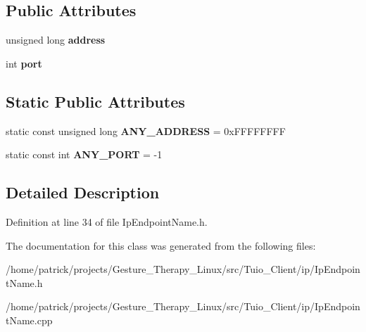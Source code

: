 \subsection*{Public Attributes}
\begin{DoxyCompactItemize}
\item 
\mbox{\label{class_ip_endpoint_name_abd6381f8195c48a266928a5a94f0017b}} 
unsigned long {\bfseries address}
\item 
\mbox{\label{class_ip_endpoint_name_a1fb3434efd055e652f9b4b43ef5ae41b}} 
int {\bfseries port}
\end{DoxyCompactItemize}
\subsection*{Static Public Attributes}
\begin{DoxyCompactItemize}
\item 
\mbox{\label{class_ip_endpoint_name_afea73a019c63cf3aa2bae83b0e1499ab}} 
static const unsigned long {\bfseries A\+N\+Y\+\_\+\+A\+D\+D\+R\+E\+SS} = 0x\+F\+F\+F\+F\+F\+F\+FF
\item 
\mbox{\label{class_ip_endpoint_name_af3844756d4c2ce453336e8096d009d6d}} 
static const int {\bfseries A\+N\+Y\+\_\+\+P\+O\+RT} = -\/1
\end{DoxyCompactItemize}


\subsection{Detailed Description}


Definition at line 34 of file Ip\+Endpoint\+Name.\+h.



The documentation for this class was generated from the following files\+:\begin{DoxyCompactItemize}
\item 
/home/patrick/projects/\+Gesture\+\_\+\+Therapy\+\_\+\+Linux/src/\+Tuio\+\_\+\+Client/ip/Ip\+Endpoint\+Name.\+h\item 
/home/patrick/projects/\+Gesture\+\_\+\+Therapy\+\_\+\+Linux/src/\+Tuio\+\_\+\+Client/ip/Ip\+Endpoint\+Name.\+cpp\end{DoxyCompactItemize}
